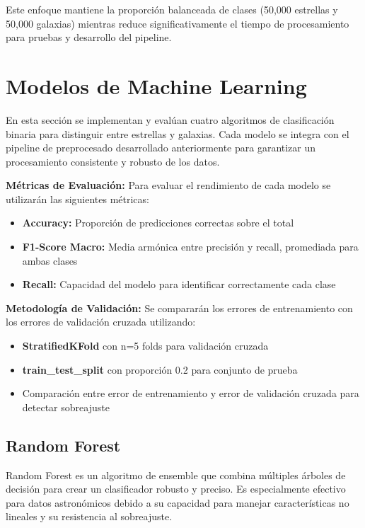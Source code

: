 \documentclass{article}
\begin{document}
Este enfoque mantiene la proporción balanceada de clases (50,000 estrellas y 50,000 galaxias) mientras reduce significativamente el tiempo de procesamiento para pruebas y desarrollo del pipeline.

\newpage

\section{Modelos de Machine Learning}

En esta sección se implementan y evalúan cuatro algoritmos de clasificación binaria para distinguir entre estrellas y galaxias. Cada modelo se integra con el pipeline de preprocesado desarrollado anteriormente para garantizar un procesamiento consistente y robusto de los datos.

\textbf{Métricas de Evaluación:}
Para evaluar el rendimiento de cada modelo se utilizarán las siguientes métricas:
\begin{itemize}
    \item \textbf{Accuracy:} Proporción de predicciones correctas sobre el total
    \item \textbf{F1-Score Macro:} Media armónica entre precisión y recall, promediada para ambas clases
    \item \textbf{Recall:} Capacidad del modelo para identificar correctamente cada clase
\end{itemize}

\textbf{Metodología de Validación:}
Se compararán los errores de entrenamiento con los errores de validación cruzada utilizando:
\begin{itemize}
    \item \textbf{StratifiedKFold} con n=5 folds para validación cruzada
    \item \textbf{train\_test\_split} con proporción 0.2 para conjunto de prueba
    \item Comparación entre error de entrenamiento y error de validación cruzada para detectar sobreajuste
\end{itemize}

\subsection{Random Forest}

Random Forest es un algoritmo de ensemble que combina múltiples árboles de decisión para crear un clasificador robusto y preciso. Es especialmente efectivo para datos astronómicos debido a su capacidad para manejar características no lineales y su resistencia al sobreajuste.
\end{document}
